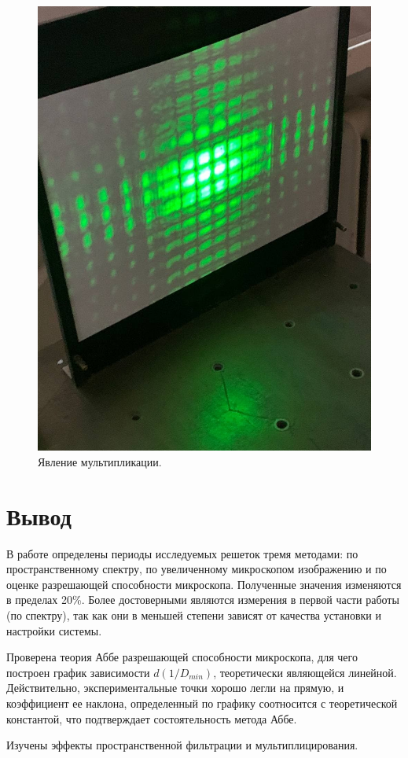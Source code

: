\documentclass[a4paper,12pt]{article}
\begin{document}
\begin{figure}[h]
\includegraphics[scale=0.5]{lab1.jpg}
\centering
\caption{Явление мультипликации.}
\end{figure}

\section{Вывод} 

В работе определены периоды исследуемых решеток тремя методами: по пространственному спектру, по увеличенному микроскопом изображению и по оценке разрешающей способности микроскопа. Полученные значения изменяются в пределах 20\%. Более достоверными являются измерения в первой части работы (по спектру), так как они в меньшей степени зависят от качества установки и настройки системы. 

Проверена теория Аббе разрешающей способности микроскопа, для чего построен график зависимости $d(1/D_{min})$, теоретически являющейся линейной. Действительно, экспериментальные точки хорошо легли на прямую, и коэффициент ее наклона, определенный по графику  соотносится с теоретической константой, что подтверждает состоятельность метода Аббе.

Изучены эффекты пространственной фильтрации и мультиплицирования. 
\end{document}

